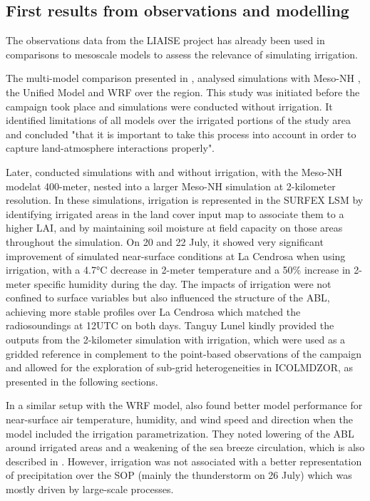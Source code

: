 \subsection{First results from observations and modelling}

The observations data from the LIAISE project has already been used in comparisons to mesoscale models to assess the relevance of simulating irrigation. 

The multi-model comparison presented in \citet{jimenez_land-surface_2025}, analysed simulations with Meso-NH  \citep{lac_overview_2018}, the Unified Model \citep{bush_second_2023,walters_met_2017} and WRF \citep{skamarock2021description} over the region. This study was initiated before the campaign took place and simulations were conducted without irrigation. It identified limitations of all models over the irrigated portions of the study area and concluded "that it is important to take this process into account in order to capture land-atmosphere interactions properly".

Later, \citet{lunel_irrigation_2024} conducted simulations with and without irrigation, with the Meso-NH modelat 400-meter, nested into a larger Meso-NH simulation at 2-kilometer resolution. 
In these simulations, irrigation is represented in the SURFEX LSM \citep[Surface Externalisée][]{masson_surfexv72_2013} by identifying irrigated areas in the land cover input map to associate them to a higher LAI, and by maintaining soil moisture at field capacity on those areas throughout the simulation.
On 20 and 22 July, it showed very significant improvement of simulated near-surface conditions at La Cendrosa when using irrigation, with a 4.7°C decrease in 2-meter temperature and a 50\% increase in 2-meter specific humidity during the day. The impacts of irrigation were not confined to surface variables but also influenced the structure of the ABL, achieving more stable profiles over La Cendrosa which matched the radiosoundings at 12UTC on both days. 
Tanguy Lunel kindly provided the outputs from the 2-kilometer simulation with irrigation, which were used as a gridded reference in complement to the point-based observations of the campaign and allowed for the exploration of sub-grid heterogeneities in ICOLMDZOR, as presented in the following sections.

In a similar setup with the WRF model, \citet{udina_irrigation_2024} also found better model performance for near-surface air temperature, humidity, and wind speed and direction when the model included the irrigation parametrization. They noted lowering of the ABL around irrigated areas and a weakening of the sea breeze circulation, which is also described in \citet{lunel_marinada_2024}.
However, irrigation was not associated with a better representation of precipitation over the SOP (mainly the thunderstorm on 26 July) which was mostly driven by large-scale processes.

